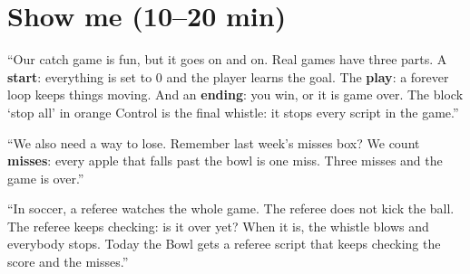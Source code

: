 \section{Show me (10--20 min)}
\begin{teacherscript}
\enquote{Our catch game is fun, but it goes on and on. Real games have three parts. A \textbf{start}: everything is set to 0 and the player learns the goal. The \textbf{play}: a forever loop keeps things moving. And an \textbf{ending}: you win, or it is game over. The block \enquote{stop all} in orange Control is the final whistle: it stops every script in the game.}

\enquote{We also need a way to lose. Remember last week's misses box? We count \textbf{misses}: every apple that falls past the bowl is one miss. Three misses and the game is over.}
\end{teacherscript}

\begin{analogy}
\enquote{In soccer, a referee watches the whole game. The referee does not kick the ball. The referee keeps checking: is it over yet? When it is, the whistle blows and everybody stops. Today the Bowl gets a referee script that keeps checking the score and the misses.}
\end{analogy}

